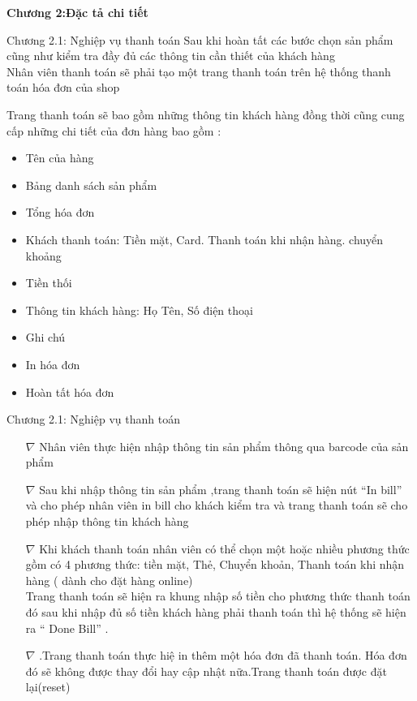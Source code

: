 \documentclass{beamer}
\begin{document}
\begin{frame}
    \fontsize{20}{20}\selectfont\textbf{Chương 2:Đặc tả chi tiết}
\end{frame}
\begin{frame}{Chương 2.1: Nghiệp vụ thanh toán}
    Sau khi hoàn tất các bước chọn sản phẩm cũng như kiểm tra đầy đủ các thông tin cần thiết của khách hàng\\
    
    Nhân viên thanh toán sẽ phải tạo một trang thanh toán trên hệ thống thanh toán hóa đơn của shop
    
    Trang thanh toán sẽ bao gồm những thông tin khách hàng đồng thời cũng cung cấp những chi tiết của đơn hàng bao gồm : 

        \begin{itemize}
            \item Tên của hàng
            \item Bảng danh sách sản phẩm
            \item Tổng hóa đơn
            \item Khách thanh toán: Tiền mặt, Card. Thanh toán khi nhận hàng. chuyển khoảng
            \item Tiền thối
            \item Thông tin khách hàng: Họ Tên, Số điện thoại
            \item Ghi chú
            \item In hóa đơn
            \item Hoàn tất hóa đơn
        \end{itemize}
\end{frame}
\begin{frame}{Chương 2.1: Nghiệp vụ thanh toán}

    \begin{itemize}
        \item [$\nabla$] Nhân viên thực hiện nhập thông tin sản phẩm thông qua barcode của sản phẩm\\
        \item [$\nabla$] Sau khi nhập thông tin sản phẩm ,trang thanh toán sẽ hiện nút “In bill” và cho phép nhân viên in bill cho khách kiểm tra và trang thanh toán sẽ cho phép nhập thông tin khách hàng\\
        \item [$\nabla$]Khi khách thanh toán nhân viên có thể chọn một hoặc nhiều phương thức gồm có 4 phương thức: tiền mặt, Thẻ, Chuyển khoản, Thanh toán khi nhận hàng ( dành cho đặt hàng online)\\
          Trang thanh toán sẽ hiện ra khung nhập số tiền cho phương thức thanh toán đó sau khi nhập đủ số tiền khách hàng phải thanh toán thì hệ thống sẽ hiện ra “ Done Bill” . 
        \item [$\nabla$] .Trang thanh toán thực hiệ in thêm một hóa đơn đã thanh toán. Hóa đơn đó sẽ không được thay đổi hay cập nhật nữa.Trang thanh toán được đặt lại(reset)
                                        
    \end{itemize}
\end{frame}
\end{document}
